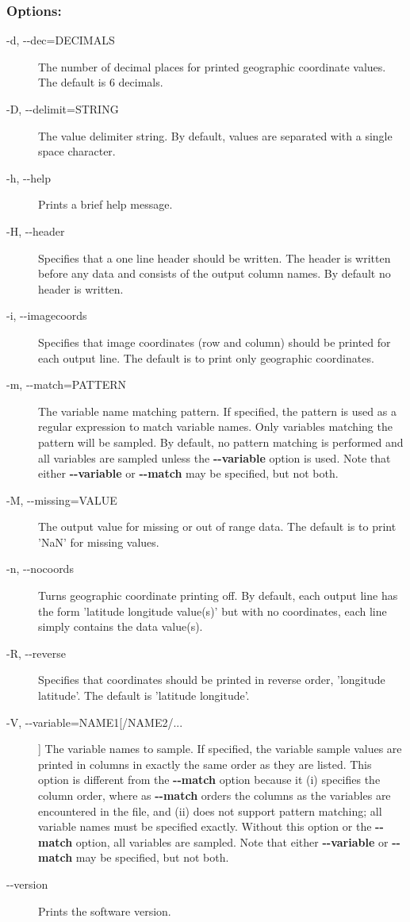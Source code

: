 \subsubsection*{Options:}
\begin{description}
\item[ -d, -{-}dec=DECIMALS ] The number of decimal places for printed geographic coordinate values. The default is 6 decimals. 
\item[ -D, -{-}delimit=STRING ] The value delimiter string. By default, values are separated with a single space character. 
\item[ -h, -{-}help ] Prints a brief help message. 
\item[ -H, -{-}header ] Specifies that a one line header should be written. The header is written before any data and consists of the output column names. By default no header is written. 
\item[ -i, -{-}imagecoords ] Specifies that image coordinates (row and column) should be printed for each output line. The default is to print only geographic coordinates. 
\item[ -m, -{-}match=PATTERN ] The variable name matching pattern. If specified, the pattern is used as a regular expression to match variable names. Only variables matching the pattern will be sampled. By default, no pattern matching is performed and all variables are sampled unless the \textbf{-{-}variable}
 option is used. Note that either \textbf{-{-}variable}
 or \textbf{-{-}match}
 may be specified, but not both.
\item[ -M, -{-}missing=VALUE ] The output value for missing or out of range data. The default is to print 'NaN' for missing values. 
\item[ -n, -{-}nocoords ] Turns geographic coordinate printing off. By default, each output line has the form 'latitude longitude value(s)' but with no coordinates, each line simply contains the data value(s). 
\item[ -R, -{-}reverse ] Specifies that coordinates should be printed in reverse order, 'longitude latitude'. The default is 'latitude longitude'. 
\item[ -V, -{-}variable=NAME1[/NAME2/...] ] The variable names to sample. If specified, the variable sample values are printed in columns in exactly the same order as they are listed. This option is different from the \textbf{-{-}match}
 option because it (i) specifies the column order, where as \textbf{-{-}match}
 orders the columns as the variables are encountered in the file, and (ii) does not support pattern matching; all variable names must be specified exactly. Without this option or the \textbf{-{-}match}
 option, all variables are sampled. Note that either \textbf{-{-}variable}
 or \textbf{-{-}match}
 may be specified, but not both.
\item[-{-}version]Prints the software version.

\end{description}
